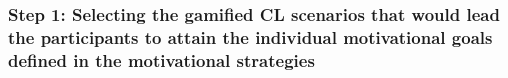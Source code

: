 

\subsubsection*{Step 1: Selecting the gamified CL scenarios that would lead the participants to attain the individual motivational goals defined in the motivational strategies}

